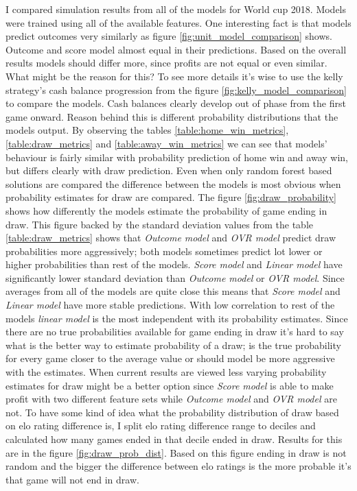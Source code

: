 I compared simulation results from all of the models for World cup 2018. Models were trained using all of the available features. One interesting fact is that models predict outcomes very similarly as figure \ref{fig:unit_model_comparison} shows. Outcome and score model almost equal in their predictions. Based on the overall results models should differ more, since profits are not equal or even similar. What might be the reason for this? To see more details it's wise to use the kelly strategy's cash balance progression from the figure \ref{fig:kelly_model_comparison} to compare the models. Cash balances clearly develop out of phase from the first game onward. Reason behind this is different probability distributions that the models output. By observing the tables \ref{table:home_win_metrics}, \ref{table:draw_metrics} and \ref{table:away_win_metrics} we can see that models' behaviour is fairly similar with probability prediction of home win and away win, but differs clearly with draw prediction. Even when only random forest based solutions are compared the difference between the models is most obvious when probability estimates for draw are compared. The figure \ref{fig:draw_probability} shows how differently the models estimate the probability of game ending in draw. This figure backed by the standard deviation values from the table \ref{table:draw_metrics} shows that \textit{Outcome model} and \textit{OVR model} predict draw probabilities more aggressively; both models sometimes predict lot lower or higher probabilities than rest of the models. \textit{Score model} and \textit{Linear model} have significantly lower standard deviation than \textit{Outcome model} or \textit{OVR model}. Since averages from all of the models are quite close this means that \textit{Score model} and \textit{Linear model} have more stable predictions. With low correlation to rest of the models \textit{linear model} is the most independent with its probability estimates. Since there are no true probabilities available for game ending in draw it's hard to say what is the better way to estimate probability of a draw; is the true probability for every game closer to the average value or should model be more aggressive with the estimates. When current results are viewed less varying probability estimates for draw might be a better option since \textit{Score model} is able to make profit with two different feature sets while \textit{Outcome model} and \textit{OVR model} are not. To have some kind of idea what the probability distribution of draw based on elo rating difference is, I split elo rating difference range to deciles and calculated how many games ended in that decile ended in draw. Results for this are in the figure \ref{fig:draw_prob_dist}. Based on this figure ending in draw is not random and the bigger the difference between elo ratings is the more probable it's that game will not end in draw.

